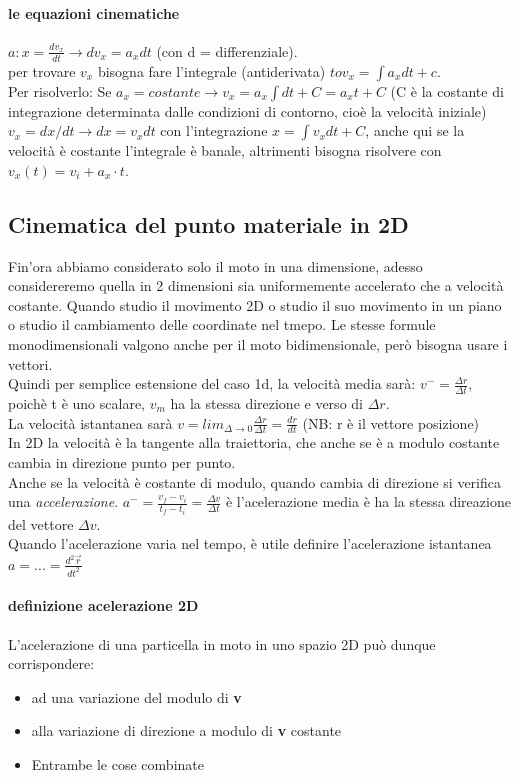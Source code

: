 \documentclass[12pt, a4paper, openany]{book}
\begin{document}
\paragraph*{le equazioni cinematiche} $a:x = \frac{dv_x}{dt} \to dv_x = a_xdt$ (con d = differenziale).
\\per trovare $v_x$ bisogna fare l'integrale (antiderivata) $to v_x = \int a_xdt+c$.
\\Per risolverlo: Se $a_x = costante \to v_x = a_x \int dt + C = a_xt+C$ (C è la costante di integrazione determinata dalle condizioni di contorno, cioè la velocità iniziale)
\\$v_x = dx/dt \to dx=v_xdt$ con l'integrazione $x = \int v_xdt + C$, anche qui se la velocità è costante l'integrale è banale, altrimenti bisogna risolvere con $v_x(t) = v_i + a_x \cdot t$.

    \subsection*{Cinematica del punto materiale in 2D}
    Fin'ora abbiamo considerato solo il moto in una dimensione, adesso considereremo quella in 2 dimensioni sia uniformemente accelerato che a velocità costante.
    Quando studio il movimento 2D o studio il suo movimento in un piano o studio il cambiamento delle coordinate nel tmepo.
    Le stesse formule monodimensionali valgono anche per il moto bidimensionale, però bisogna usare i vettori.
    \\Quindi per semplice estensione del caso 1d, la velocità media sarà: $v^- = \frac{\Delta r}{\Delta t}$, poichè t è uno scalare, $v_m$ ha la stessa direzione e verso di $\Delta r$.
    \\La velocità istantanea sarà $v = lim_{\Delta \to 0 } \frac{\Delta r}{\Delta t} = \frac{dr}{dt}$ (NB: r è il vettore posizione)
    \\In 2D la velocità è la tangente alla traiettoria, che anche se è a modulo costante cambia in direzione punto per punto.
    \\Anche se la velocità è costante di modulo, quando cambia di direzione si verifica una \emph{accelerazione}.
$a^- = \frac{v_f-v_i}{t_f-t_i}= \frac{\Delta v}{\Delta t}$ è l'acelerazione media è ha la stessa direazione del vettore $\Delta v$.
    \\Quando l'acelerazione varia nel tempo, è utile definire l'acelerazione istantanea $a = ... = \frac{d^2 \overrightarrow{r} }{dt^2}$
    \paragraph*{definizione acelerazione 2D} L'acelerazione di una particella in moto in uno spazio 2D può dunque corrispondere:
    \begin{itemize}
        \item ad una variazione del modulo di \textbf{v}
        \item alla variazione di direzione a modulo di \textbf{v} costante
        \item Entrambe le cose combinate
    \end{itemize}
\end{document}
